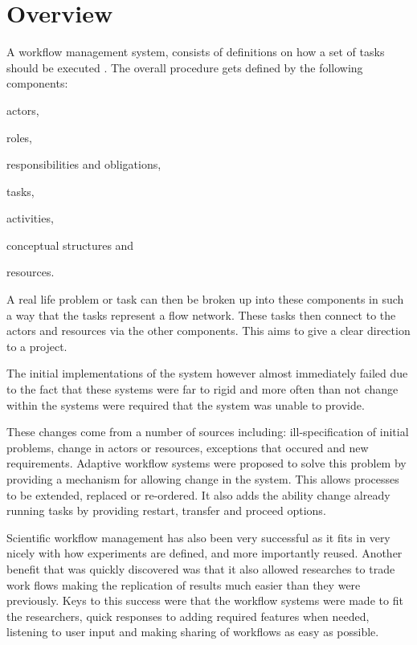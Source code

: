 \documentclass[11pt,twocolumn]{article}
\begin{document}
\section{Overview}
    A workflow management system, consists of definitions
    on how a set of tasks should be executed
    \cite{springerlink:10.1007/BF00136712,vanderAalst2002125}.
    The overall procedure gets defined by the following
components: \begin{inparaenum}[(i)] \item actors,
    \item roles, \item responsibilities and
    obligations, \item tasks, \item activities,\item conceptual structures
    and \item resources.\end{inparaenum}

    A real life problem or task can then be broken up into these
    components in such a way that the tasks represent a flow
    network. These tasks then connect to the actors and resources
    via the other components\cite[p.~4]{Taylor:2006:WES:1196459}.
    This aims to give a clear direction to a project.

    The initial implementations of the system
    however almost immediately failed due to the fact that
    these systems were far to rigid and more often than not
    change within the systems were
    required that the system was unable to provide\cite{Suchman:1983:OPP:357442.357445}.

    These changes come from a number of sources including:
    ill-specification of initial problems, change in actors
    or resources, exceptions that occured and new requirements.
    Adaptive workflow systems were proposed to solve this
    problem by providing a mechanism for allowing change in
    the system. This allows processes to be extended,
    replaced or re-ordered. It also adds the ability change
    already running tasks by providing restart, transfer and
    proceed options\cite{vanderAalst2002125}.

    Scientific workflow management has also been very
    successful as it fits in very nicely with how experiments
    are defined, and more importantly reused. Another
    benefit that was quickly discovered was that it also
    allowed researches to trade work flows making the
    replication of results much easier than they were
    previously. Keys to this success were that the workflow
    systems were made to fit the researchers, quick responses
    to adding required features when needed, listening
    to user input and making sharing of workflows as easy as
    possible\cite{4721191}.
\end{document}

